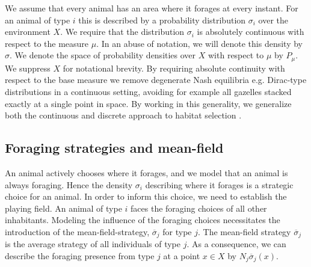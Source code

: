 We assume that every animal has an area where it forages at every instant. For an animal of type $i$ this is described by a probability distribution $\sigma_i$ over the environment $X$. We require that the distribution $\sigma_i$ is absolutely continuous with respect to the measure $\mu$. In an abuse of notation, we will denote this density by $\sigma$. We denote the space of probability densities over $X$ with respect to $\mu$ by $P_{\mu}$. We suppress $X$ for notational brevity. By requiring absolute continuity with respect to the base measure we remove degenerate Nash equilibria e.g. Dirac-type distributions in a continuous setting, avoiding for example all gazelles stacked exactly at a single point in space. By working in this generality, we generalize both the continuous and discrete approach to habitat selection \citep{fretwell1969territorial, broom2013game, verticalmigration}.


\subsection{Foraging strategies and mean-field}
An animal actively chooses where it forages, and we model that an animal is always foraging. Hence the density $\sigma_i$ describing where it forages is a strategic choice for an animal. In order to inform this choice, we need to establish the playing field. An animal of type $i$ faces the foraging choices of all other inhabitants. Modeling the influence of the foraging choices necessitates the introduction of the mean-field-strategy, $\overbar{\sigma}_j$ for type $j$. The mean-field strategy $\overbar{\sigma}_j$ is the average strategy of all individuals of type $j$. As a consequence, we can describe the foraging presence from type $j$ at a point $x\in X$ by $N_j \overbar{\sigma}_j(x)$.


